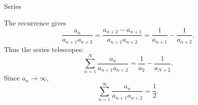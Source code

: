 \begin{expectedproblemgroup}{Series}
        \begin{expectedsubsolution}
            The recurrence gives
            \[
                \frac{a_n}{a_{n+1}a_{n+2}}
                =
                \frac{a_{n+2}-a_{n+1}}{a_{n+1}a_{n+2}}
                =
                \frac{1}{a_{n+1}}-\frac{1}{a_{n+2}}.
            \]
            Thus the series telescopes:
            \[
                \sum_{n=1}^{N}
                \frac{a_n}{a_{n+1}a_{n+2}}
                =
                \frac{1}{a_2}-\frac{1}{a_{N+2}}.
            \]
            Since $a_n\to\infty$,
            \[
                \boxed{
                    \sum_{n=1}^{\infty}
                    \frac{a_n}{a_{n+1}a_{n+2}}
                    =
                    \frac12
                }.
            \]
        \end{expectedsubsolution}

    \end{expectedproblemgroup}

